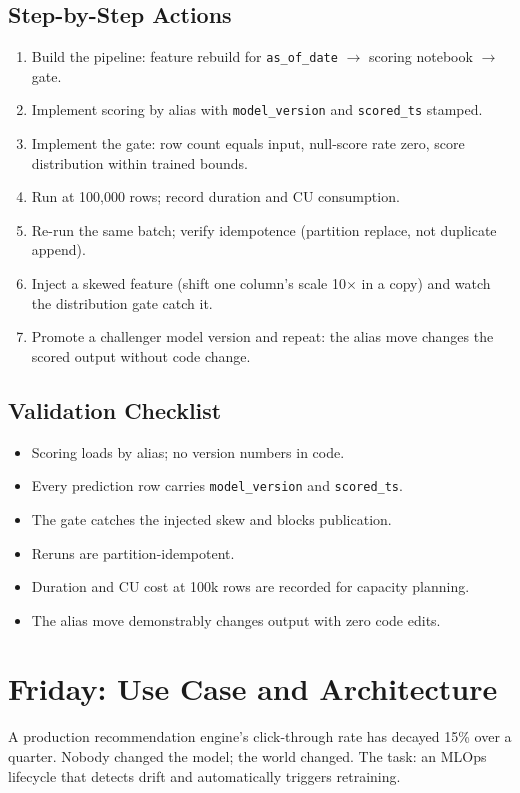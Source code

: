 \subsection{Step-by-Step Actions}
\begin{enumerate}
    \item Build the pipeline: feature rebuild for \texttt{as\_of\_date} $\rightarrow$ scoring notebook $\rightarrow$ gate.
    \item Implement scoring by alias with \texttt{model\_version} and \texttt{scored\_ts} stamped.
    \item Implement the gate: row count equals input, null-score rate zero, score distribution within trained bounds.
    \item Run at 100,000 rows; record duration and CU consumption.
    \item Re-run the same batch; verify idempotence (partition replace, not duplicate append).
    \item Inject a skewed feature (shift one column's scale 10$\times$ in a copy) and watch the distribution gate catch it.
    \item Promote a challenger model version and repeat: the alias move changes the scored output without code change.
\end{enumerate}

\subsection{Validation Checklist}
\begin{itemize}
    \item Scoring loads by alias; no version numbers in code.
    \item Every prediction row carries \texttt{model\_version} and \texttt{scored\_ts}.
    \item The gate catches the injected skew and blocks publication.
    \item Reruns are partition-idempotent.
    \item Duration and CU cost at 100k rows are recorded for capacity planning.
    \item The alias move demonstrably changes output with zero code edits.
\end{itemize}

\section{Friday: Use Case and Architecture}
A production recommendation engine's click-through rate has decayed 15\% over a quarter. Nobody changed the model; the world changed. The task: an MLOps lifecycle that detects drift and automatically triggers retraining.

